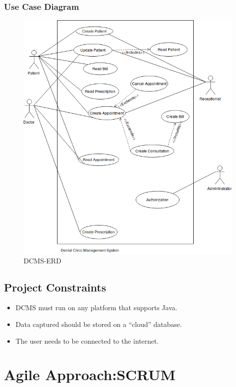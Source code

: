 \documentclass[12pt]{article}
\begin{document}
\subsubsection{Use Case Diagram}

\begin{figure}[h]
    \centering
    \includegraphics[scale = 0.5]{Use Case Diagram.png}
    \caption{DCMS-ERD}
    \label{fig:ERD}
    \end{figure}

    \subsection{Project Constraints}
    \begin{itemize}
    \item
    DCMS must run on any platform that supports Java.
    \item
    Data captured should be stored on a “cloud” database.
    \item
    The user needs to be connected to the internet.
    \end{itemize}
\section{Agile Approach:SCRUM}
\end{document}
